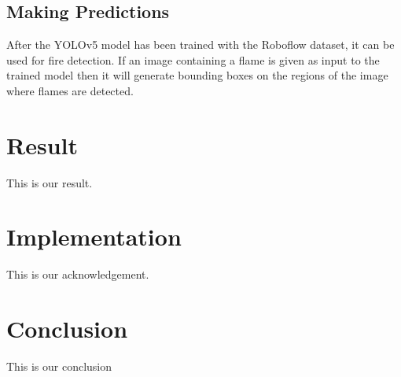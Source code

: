 \documentclass[conference]{IEEEtran}
\begin{document}
 \subsection{Making Predictions}
  After the YOLOv5 model has been trained with the Roboflow dataset, it can be used for fire detection. If an image containing a flame is given as input to the trained model then it will generate bounding boxes on the regions of the image where flames are detected.

\section*{Result}

This is our result.

\section*{Implementation}

This is our acknowledgement.

\section*{Conclusion}

This is our conclusion
\end{document}
